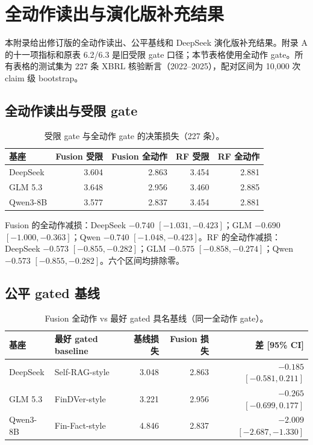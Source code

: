 \chapter{全动作读出与演化版补充结果}
\label{app:evolution}

\begin{revbox}
\noindent 本附录给出修订版的全动作读出、公平基线和 DeepSeek 演化版补充结果。附录 A 的十一项指标和原表 6.2/6.3 是旧受限 gate 口径；本节表格使用全动作 gate。所有表格的测试集为 227 条 XBRL 核验断言（2022--2025），配对区间为 10,000 次 claim 级 bootstrap。
\end{revbox}

\section{全动作读出与受限 gate}

\begin{table}[H]
\centering
{}
\setlength{\tabcolsep}{3pt}
\caption{受限 gate 与全动作 gate 的决策损失（227 条）。}
\label{tab:g-fullaction}
\begin{tabular}{lrrrr}
\toprule
基座 & Fusion 受限 & Fusion 全动作 & RF 受限 & RF 全动作 \\
\midrule
DeepSeek & 3.604 & \cellcolor{yellow!25}2.863 & 3.454 & \cellcolor{yellow!25}2.881 \\
GLM 5.3 & 3.648 & \cellcolor{yellow!25}2.956 & 3.460 & \cellcolor{yellow!25}2.885 \\
Qwen3-8B & 3.577 & \cellcolor{yellow!25}2.837 & 3.454 & \cellcolor{yellow!25}2.881 \\
\bottomrule
\end{tabular}
\end{table}

\begin{revbox}
\noindent Fusion 的全动作减损：DeepSeek $-0.740$ $[-1.031,-0.423]$；GLM $-0.690$ $[-1.000,-0.363]$；Qwen $-0.740$ $[-1.048,-0.423]$。RF 的全动作减损：DeepSeek $-0.573$ $[-0.855,-0.282]$；GLM $-0.575$ $[-0.858,-0.274]$；Qwen $-0.573$ $[-0.855,-0.282]$。六个区间均排除零。
\end{revbox}

\section{公平 gated 基线}

\begin{table}[H]
\centering
{}
\setlength{\tabcolsep}{3pt}
\caption{Fusion 全动作 vs 最好 gated 具名基线（同一全动作 gate）。}
\label{tab:g-fair}
\begin{tabular}{llrrr}
\toprule
基座 & 最好 gated baseline & 基线损失 & Fusion 损失 & 差 [95\% CI] \\
\midrule
DeepSeek & Self-RAG-style & 3.048 & 2.863 & $-0.185$ $[-0.581,0.211]$ \\
GLM 5.3 & FinDVer-style & 3.221 & 2.956 & $-0.265$ $[-0.699,0.177]$ \\
Qwen3-8B & Fin-Fact-style & 4.846 & 2.837 & $-2.009$ $[-2.687,-1.330]$ \\
\bottomrule
\end{tabular}
\end{table}

